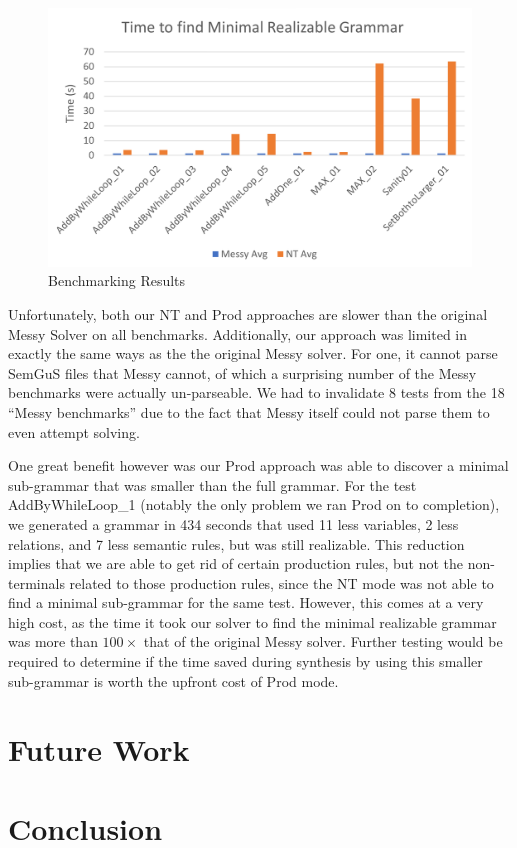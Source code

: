 \documentclass[acmsmall, nonacm]{acmart}
\begin{document}
\begin{figure}[H]
  \centering
  \includegraphics[width=1\textwidth]{Results.png}
  \caption{Benchmarking Results}
  \label{fig:Benchmarking-Results}
\end{figure}

Unfortunately, both our NT and Prod approaches are slower than the original Messy Solver on all benchmarks.
Additionally, our approach was limited in exactly the same ways as the the original Messy solver. For one, it cannot parse SemGuS files that Messy cannot, of which a surprising number of the Messy benchmarks were actually un-parseable.
We had to invalidate 8 tests from the 18 “Messy benchmarks” due to the fact that Messy itself could not parse them to even attempt solving.

One great benefit however was our Prod approach was able to discover a minimal sub-grammar that was smaller than the full grammar. For the test AddByWhileLoop_1 (notably the only problem we ran Prod on to completion), we
generated a grammar in 434 seconds that used 11 less variables, 2 less relations, and 7 less semantic rules, but was still realizable.
This reduction implies that we are able to get rid of certain production rules, but not the non-terminals related to those production rules, since
the NT mode was not able to find a minimal sub-grammar for the same test.
However, this comes at a very high cost, as the time it took our solver to find the minimal realizable grammar was more than $100 \times$ that of the original Messy solver. Further testing would be required to determine if the time saved during synthesis by using this smaller sub-grammar is worth the upfront cost of Prod mode.

\section{Future Work}

\section{Conclusion}



\end{document}
